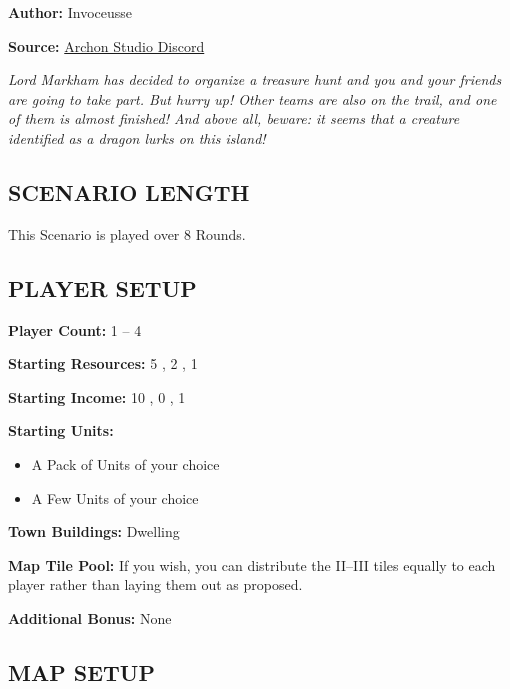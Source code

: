 
\begin{multicols*}{2}

\textbf{Author:} Invoceusse

\textbf{Source:} \href{https://discord.com/channels/740870068178649108/1222679455261261986}{Archon Studio Discord}

\textit{Lord Markham has decided to organize a treasure hunt and you and your friends are going to take part.
  But hurry up! Other teams are also on the trail, and one of them is almost finished!
  And above all, beware: it seems that a creature identified as a dragon lurks on this island!}
\subsection*{\MakeUppercase{Scenario Length}}

This Scenario is played over 8 Rounds.

\subsection*{\MakeUppercase{Player Setup}}

\textbf{Player Count:} 1 -- 4

\textbf{Starting Resources:} 5 , 2 , 1 

\textbf{Starting Income:} 10 , 0 , 1 

\textbf{Starting Units:}
\begin{itemize}
  \item A Pack of  Units of your choice
  \item A Few  Units of your choice
\end{itemize}

\textbf{Town Buildings:}  Dwelling

\textbf{Map Tile Pool:} If you wish, you can distribute the II--III tiles equally to each player rather than laying them out as proposed.

\textbf{Additional Bonus:} None

\subsection*{\MakeUppercase{Map Setup}}


\end{multicols*}
